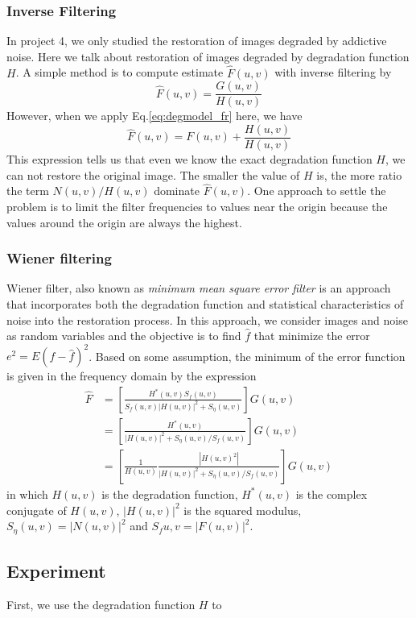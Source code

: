 \subsubsection{Inverse Filtering}
In project 4, we only studied the restoration of images degraded by addictive noise. Here we talk about restoration of images degraded by degradation function $H$. A simple method is to compute estimate $\hat{F}(u,v)$ with inverse filtering by \begin{equation} \hat{F}(u,v)=\frac{G(u,v)}{H(u,v)} \end{equation} However, when we apply Eq.\ref{eq:degmodel_fr} here, we have \begin{equation} \hat{F}(u,v)=F(u,v)+\frac{H(u,v)}{H(u,v)} \end{equation} This expression tells us that even we know the exact degradation function $H$, we can not restore the original image. The smaller the value of $H$ is, the more ratio the term $N(u,v)/H(u,v)$ dominate $\hat{F}(u,v)$. One approach to settle the problem is to limit the filter frequencies to values near the origin because the values around the origin are always the highest. 
\subsubsection{Wiener filtering}
Wiener filter, also known as \emph{minimum mean square error filter} is an approach that incorporates both the degradation function and statistical characteristics of noise into the restoration process. In this approach, we consider images and noise as random variables and the objective is to find $\hat{f}$ that minimize the error $e^2=E{(f-\hat{f})^2}$. Based on some assumption, the minimum of the error function is given in the frequency domain by the expression \begin{equation}\begin{aligned} \hat{F}&=\left[ \frac{H^*(u,v)S_f(u,v)}{S_f(u,v)|H(u,v)|^2+S_{\eta}(u,v)} \right]G(u,v) \\ &=\left[\frac{H^*(u,v)}{|H(u,v)|^2+S_{\eta}(u,v)/S_f(u,v)}\right]G(u,v) \\ &=\left[ \frac{1}{H(u,v)}\frac{|H(u,v)^2|}{|H(u,v)|^2+S_{\eta}(u,v)/S_f(u,v)} \right]G(u,v) \end{aligned}\end{equation} in which $H(u,v)$ is the degradation function, $H^*(u,v)$ is the complex conjugate of $H(u,v)$, $|H(u,v)|^2$ is the squared modulus, $S_{\eta}(u,v)=|N(u,v)|^2$ and $S_f{u,v}=|F(u,v)|^2$.

\subsection{Experiment}
First, we use the degradation function $H$ to 